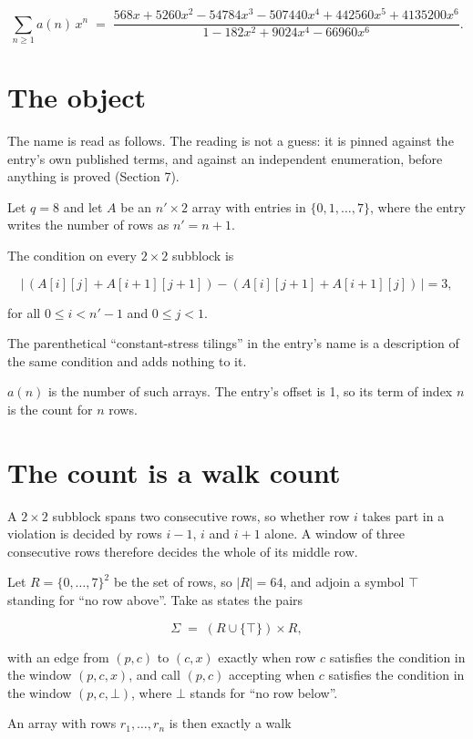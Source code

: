 \documentclass[11pt]{article}
\theoremstyle{definition}
\begin{document}
\[\sum_{n \ge 1} a(n)\,x^n \;=\; \frac{568x + 5260x^{2} - 54784x^{3} - 507440x^{4} + 442560x^{5} + 4135200x^{6}}{1 - 182x^{2} + 9024x^{4} - 66960x^{6}}.\]

\section{The object}

The name is read as follows. The reading is not a guess: it is pinned against the entry's own published terms, and against an independent enumeration, before anything is proved (Section 7).

Let $q = 8$ and let $A$ be an $n' \times 2$ array with entries in $\{0,1,\dots,7\}$, where the entry writes the number of rows as $n' = n + 1$.

The condition on every $2 \times 2$ subblock is

\[\bigl|\,(A[i][j] + A[i{+}1][j{+}1]) - (A[i][j{+}1] + A[i{+}1][j])\,\bigr| = 3,\]

for all $0 \le i < n'-1$ and $0 \le j < 1$.

The parenthetical ``constant-stress tilings'' in the entry's name is a description of the same condition and adds nothing to it.

$a(n)$ is the number of such arrays. The entry's offset is 1, so its term of index $n$ is the count for $n$ rows.

\section{The count is a walk count}

A $2 \times 2$ subblock spans two consecutive rows, so whether row $i$ takes part in a violation is decided by rows $i-1$, $i$ and $i+1$ alone. A window of three consecutive rows therefore decides the whole of its middle row.

Let $R = \{0,\dots,7\}^{2}$ be the set of rows, so $|R| = 64$, and adjoin a symbol $\top$ standing for ``no row above''. Take as states the pairs

\[\Sigma \;=\; (R \cup \{\top\}) \times R,\]

with an edge from $(p,c)$ to $(c,x)$ exactly when row $c$ satisfies the condition in the window $(p,c,x)$, and call $(p,c)$ accepting when $c$ satisfies the condition in the window $(p,c,\bot)$, where $\bot$ stands for ``no row below''.

An array with rows $r_1,\dots,r_n$ is then exactly a walk
\end{document}
